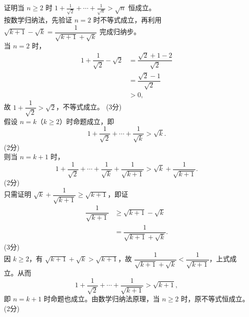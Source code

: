 \documentclass[12pt,a4paper]{exam-zh}
\begin{document}
\begin{solution}
    证明当 $n\geqslant 2$ 时 $\displaystyle 1+\frac{1}{\sqrt2}+\cdots+\frac{1}{\sqrt n}>\sqrt n$ 恒成立。\\
    按数学归纳法，先验证 $n=2$ 时不等式成立，再利用 $\sqrt{k+1}-\sqrt{k}=\dfrac{1}{\sqrt{k+1}+\sqrt{k}}$ 完成归纳步。\\
    当 $n=2$ 时，
    \begin{align*}
        1+\dfrac{1}{\sqrt2}-\sqrt2 &= \dfrac{\sqrt2+1-2}{\sqrt2} \\
        &= \dfrac{\sqrt2-1}{\sqrt2} \\
        &>0,
    \end{align*}
    故 $1+\dfrac{1}{\sqrt2}>\sqrt2$，不等式成立。
    \hfill (3分) \\
    假设 $n=k$（$k\geqslant 2$）时命题成立，即
    \[
    1+\dfrac{1}{\sqrt2}+\cdots+\dfrac{1}{\sqrt k}>\sqrt k.
    \]
    \hfill (2分) \\
    则当 $n=k+1$ 时，
    \[
    1+\dfrac{1}{\sqrt2}+\cdots+\dfrac{1}{\sqrt k}+\dfrac{1}{\sqrt{k+1}}>\sqrt k+\dfrac{1}{\sqrt{k+1}}.
    \]
    \hfill (2分) \\
    只需证明 $\sqrt k+\dfrac{1}{\sqrt{k+1}}\geqslant \sqrt{k+1}$，即证
    \begin{align*}
        \dfrac{1}{\sqrt{k+1}} &\geqslant \sqrt{k+1}-\sqrt k \\
        &= \dfrac{1}{\sqrt{k+1}+\sqrt k}.
    \end{align*}
    \hfill (3分) \\
    因 $k\geqslant 2$，有 $\sqrt{k+1}+\sqrt k>\sqrt{k+1}$，故 $\dfrac{1}{\sqrt{k+1}+\sqrt k}<\dfrac{1}{\sqrt{k+1}}$，上式成立。从而
    \[
    1+\dfrac{1}{\sqrt2}+\cdots+\dfrac{1}{\sqrt{k+1}}>\sqrt{k+1},
    \]
    即 $n=k+1$ 时命题也成立。由数学归纳法原理，当 $n\geqslant 2$ 时，原不等式恒成立。
    \hfill (2分)
\end{solution}

\newpage
\thispagestyle{empty}
\null
\newpage
\end{document}
